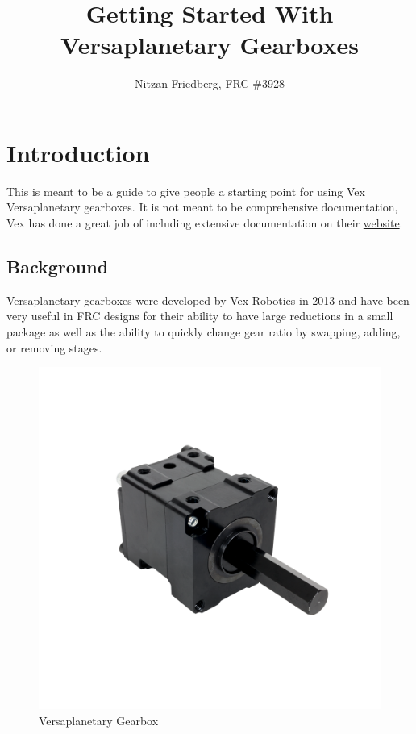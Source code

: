 \documentclass[12pt, letterpaper]{article}
\title{Getting Started With Versaplanetary Gearboxes}
\author{Nitzan Friedberg, FRC \#3928}
\date{}
\begin{document}
\maketitle

\tableofcontents

\newpage

\section{Introduction}
This is meant to be a guide to give people a starting point for using Vex Versaplanetary gearboxes. It is not meant to be comprehensive documentation, Vex has done a great job of including extensive documentation on their \href{https://www.vexrobotics.com/versaplanetary.html}{website}. 

\subsection{Background}
Versaplanetary gearboxes were developed by Vex Robotics in 2013  and have been very useful in FRC designs for their ability to have large reductions in a small package as well as the ability to quickly change gear ratio by swapping, adding, or removing stages. 

\begin{figure}[h!]
\centering
\includegraphics[scale=0.5]{Versaplanetary.png}
\caption{Versaplanetary Gearbox}
\label{fig:Versaplanetary Gearbox}
\end{figure}
\end{document}
